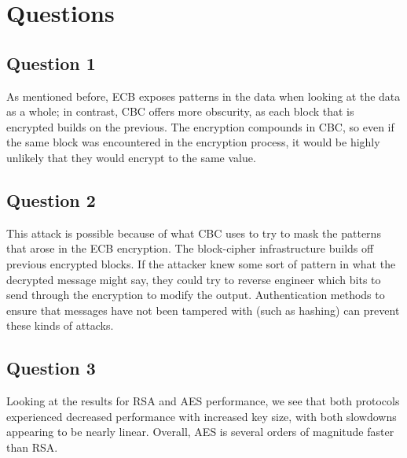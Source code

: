 \documentclass[11pt]{article}
\begin{document}
\section*{Questions}
\subsection*{Question 1}

As mentioned before, ECB exposes patterns in the data when looking at the data as a whole; in contrast, CBC offers more obscurity, as each block that is encrypted builds on the previous. The encryption compounds in CBC, so even if the same block was encountered in the encryption process, it would be highly unlikely that they would encrypt to the same value. 

\subsection*{Question 2}

This attack is possible because of what CBC uses to try to mask the patterns that arose in the ECB encryption. The block-cipher infrastructure builds off previous encrypted blocks. If the attacker knew some sort of pattern in what the decrypted message might say, they could try to reverse engineer which bits to send through the encryption to modify the output. Authentication methods to ensure that messages have not been tampered with (such as hashing) can prevent these kinds of attacks.

\subsection*{Question 3}

Looking at the results for RSA and AES performance, we see that both protocols experienced decreased performance with increased key size, with both slowdowns appearing to be nearly linear. Overall, AES is several orders of magnitude faster than RSA.
\end{document}
